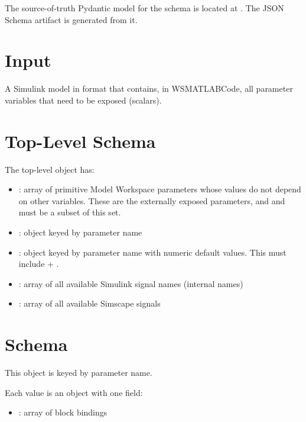 \documentclass[11pt]{article}
\begin{document}
The source-of-truth Pydantic model for the schema is located at . The JSON Schema artifact is generated from it.

\section*{Input}
A Simulink model in  format that contains, in WSMATLABCode, all parameter variables that need to be exposed (scalars).

\section*{Top-Level  Schema}

The top-level object has:
\begin{itemize}
\item {}: array of primitive Model Workspace parameters whose values do not depend on other variables. 
  These are the externally exposed parameters, and  and     must be a subset of this set.
\item {}: object keyed by parameter name
\item {}: object keyed by parameter name with numeric default values. This must include  + .
\item {}: array of all available Simulink signal names (internal names)
\item {}: array of all available Simscape signals
\end{itemize}

\section*{\texorpdfstring{}{intervention_block_map} Schema}

This object is keyed by parameter name.

Each value is an object with one field:

\begin{itemize}
\item {}: array of block bindings
\end{itemize}
\end{document}
